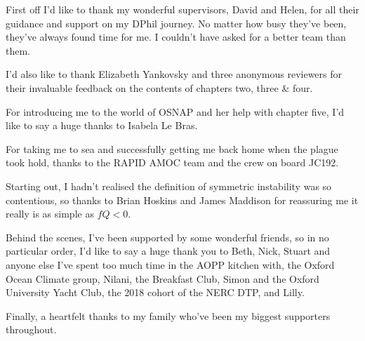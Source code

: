 \cleardoublepage
{}
{}
\begin{acknowledgements}
    \begin{spacing}{1.25}
    First off I'd like to thank my wonderful supervisors, David and Helen, for all their guidance and support on my DPhil journey. No matter how busy they've been, they've always found time for me. I couldn't have asked for a better team than them.

    I'd also like to thank Elizabeth Yankovsky and three anonymous reviewers for their invaluable feedback on the contents of chapters two, three \& four.
    
    For introducing me to the world of OSNAP and her help with chapter five, I'd like to say a huge thanks to Isabela Le Bras.

    For taking me to sea and successfully getting me back home when the plague took hold, thanks to the RAPID AMOC team and the crew on board JC192.

    Starting out, I hadn't realised the definition of symmetric instability was so contentious, so thanks to Brian Hoskins and James Maddison for reassuring me it really is as simple as $fQ < 0$.

    Behind the scenes, I've been supported by some wonderful friends, so in no particular order, I'd like to say a huge thank you to Beth, Nick, Stuart and anyone else I've spent too much time in the AOPP kitchen with, the Oxford Ocean Climate group, Nilani, the Breakfast Club, Simon and the Oxford University Yacht Club, the 2018 cohort of the NERC DTP, and Lilly.

    Finally, a heartfelt thanks to my family who've been my biggest supporters throughout.
    \end{spacing}
\end{acknowledgements}